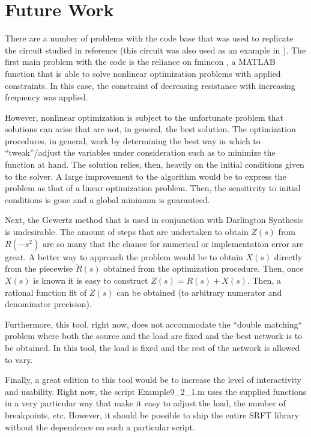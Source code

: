 \section*{Future Work}

There are a number of problems with the code base that was used to replicate the
circuit studied in reference \cite{opt} (this circuit was also used as an example
in \cite{wcd}). The first main problem with the code is the reliance on fmincon
, a MATLAB\textsuperscript{\textregistered} function that is able to solve
nonlinear optimization problems with applied constraints. In this case, the
constraint of decreasing resistance with increasing frequency was applied.

However, nonlinear optimization is subject to the unfortunate problem that
solutions can arise that are not, in general, the best solution. The
optimization procedures, in general, work by determining the best way in which
to ``tweak''/adjust the variables under consideration such as to minimize the
function at hand. The solution relies, then, heavily on the initial conditions
given to the solver. A large improvement to the algorithm would be to express
the problem as that of a linear optimization problem. Then, the sensitivity to
initial conditions is gone and a global minimum is guaranteed.

Next, the Gewertz method that is used in conjunction with Darlington Synthesis
is undesirable. The amount of steps that are undertaken to obtain $Z(s)$ from
$R(-s^2)$ are so many that the chance for numerical or implementation error are
great. A better way to approach the problem would be to obtain $X(s)$ directly
from the piecewise $\tilde{R}(s)$ obtained from the optimization procedure.
Then, once $X(s)$ is known it is easy to construct $Z(s) = R(s) + X(s)$.
Then, a rational function fit of $Z(s)$ can be obtained (to arbitrary numerator
and denominator precision).

Furthermore, this tool, right now, does not accommodate the ``double matching``
problem where both the source and the load are fixed and the best network is to
be obtained. In this tool, the load is fixed and the rest of the network is
allowed to vary.

Finally, a great edition to this tool would be to increase the level of
interactivity and usability. Right now, the script Example9\_2\_1.m uses the
supplied functions in a very particular way that make it easy to adjust the
load, the number of breakpoints, etc. However, it should be possible to ship the
entire SRFT library without the dependence on such a particular script.
